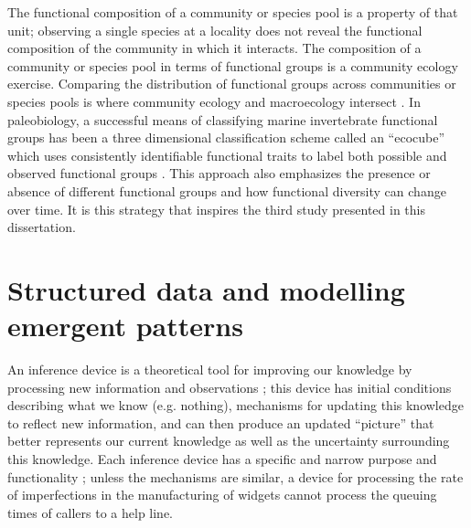 The functional composition of a community or species pool is a property of that unit; observing a single species at a locality does not reveal the functional composition of the community in which it interacts. The composition of a community or species pool in terms of functional groups is a community ecology exercise. Comparing the distribution of functional groups across communities or species pools is where community ecology and macroecology intersect \citep{Mcgill2006,Brown1995,Smith2008b}. In paleobiology, a successful means of classifying marine invertebrate functional groups has been a three dimensional classification scheme called an ``ecocube'' which uses consistently identifiable functional traits to label both possible and observed functional groups \citep{Bush2007,Bambach2007}. This approach also emphasizes the presence or absence of different functional groups and how functional diversity can change over time. It is this strategy that inspires the third study presented in this dissertation.



\section{Structured data and modelling emergent patterns}



An inference device is a theoretical tool for improving our knowledge by processing new information and observations \citep{McElreath2016,Jaynes2003a}; this device has initial conditions describing what we know (e.g. nothing), mechanisms for updating this knowledge to reflect new information, and can then produce an updated ``picture'' that better represents our current knowledge as well as the uncertainty surrounding this knowledge. Each inference device has a specific and narrow purpose and functionality \citep{McElreath2016}; unless the mechanisms are similar, a device for processing the rate of imperfections in the manufacturing of widgets cannot process the queuing times of callers to a help line.  


